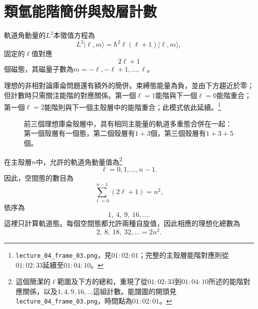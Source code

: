 \section{類氫能階簡併與殼層計數}

軌道角動量的\(L^{2}\)本徵值方程為
\begin{equation}
L^{2}\lvert\ell,m\rangle
=\hbar^{2}\ell(\ell+1)\lvert\ell,m\rangle,
\end{equation}
固定的\(\ell\)值對應
\begin{equation}
2\ell+1
\end{equation}
個磁態，其磁量子數為\(m=-\ell,-\ell+1,\ldots,\ell\)。

理想的非相對論庫侖問題還有額外的簡併。束縛態能量為負，並由下方趨近於零；但計數時只需關注能階的對應關係。第一個\(\ell=1\)能階與下一個\(\ell=0\)能階重合；第一個\(\ell=2\)能階則與下一個主殼層中的能階重合；此模式依此延續。\footnote{\texttt{lecture\_04\_frame\_03.png}，見\(01{:}02{:}01\)；完整的主殼層能階對應則從\(01{:}02{:}33\)延續至\(01{:}04{:}10\)。}

\begin{figure}[htbp]
\centering
{}
\caption{前三個理想庫侖殼層中，具有相同主能量的軌道多重態合併在一起：第一個殼層有一個態，第二個殼層有\(1+3\)個，第三個殼層有\(1+3+5\)個。}
\end{figure}

在主殼層\(n\)中，允許的軌道角動量值為\footnote{這個簡潔的\(\ell\)範圍及下方的總和，重現了從\(01{:}02{:}33\)到\(01{:}04{:}10\)所述的能階對應關係，以及\(1,4,9,16,\ldots\)這組計數。能譜圖的開頭見\texttt{lecture\_04\_frame\_03.png}，時間點為\(01{:}02{:}01\)。}
\[
\ell=0,1,\ldots,n-1.
\]
因此，空間態的數目為
\begin{equation}
\sum_{\ell=0}^{n-1}(2\ell+1)=n^{2},
\end{equation}
依序為
\begin{equation}
1,\ 4,\ 9,\ 16,\ldots .
\end{equation}
這裡只計算軌道態。每個空間態都允許兩種自旋值，因此相應的理想化總數為
\begin{equation}
2,\ 8,\ 18,\ 32,\ldots=2n^{2}.
\end{equation}


